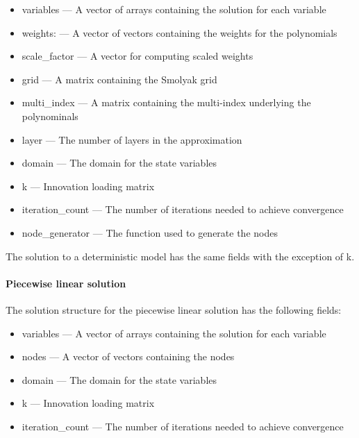 \documentclass[notitlepage,11pt]{article}
\begin{document}
\begin{itemize}
\item variables --- A vector of arrays containing the solution for each
variable

\item weights: --- A vector of vectors containing the weights for the
polynomials

\item scale\_factor --- A vector for computing scaled weights

\item grid --- A matrix containing the Smolyak grid

\item multi\_index --- A matrix containing the multi-index underlying the
polynominals

\item layer --- The number of layers in the approximation

\item domain --- The domain for the state variables

\item k --- Innovation loading matrix

\item iteration\_count --- The number of iterations needed to achieve
convergence

\item node\_generator --- The function used to generate the nodes
\end{itemize}

The solution to a deterministic model has the same fields with the exception
of k.

\paragraph{Piecewise linear solution}

The solution structure for the piecewise linear solution has the following
fields:

\begin{itemize}
\item variables --- A vector of arrays containing the solution for each
variable

\item nodes --- A vector of vectors containing the nodes

\item domain --- The domain for the state variables

\item k --- Innovation loading matrix

\item iteration\_count --- The number of iterations needed to achieve
convergence
\end{itemize}
\end{document}

